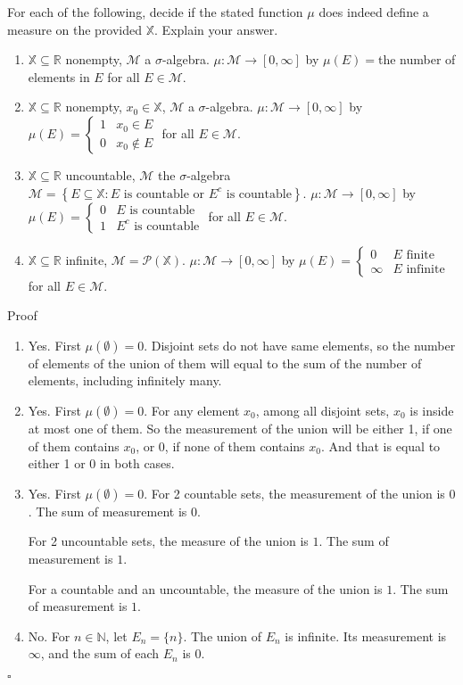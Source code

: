 \documentclass[12pt]{article}
\begin{document}
\item For each of the following, decide if the stated function $\mu$ does indeed define a measure on the provided $\mathbb{X}$.  Explain your answer.
\begin{enumerate}
\item $\mathbb{X}\subseteq\mathbb{R}$ nonempty, $\mathscr{M}$ a $\sigma$-algebra.  $\mu:\mathscr{M}\rightarrow[0,\infty]$ by $\mu(E)=$the number of elements in $E$ for all $E\in\mathscr{M}$.
\item $\mathbb{X}\subseteq\mathbb{R}$ nonempty, $x_0\in\mathbb{X}$, $\mathscr{M}$ a $\sigma$-algebra.  $\mu:\mathscr{M}\rightarrow[0,\infty]$ by $\mu(E)=\begin{cases}1&x_0\in E\\0&x_0\nin E\end{cases}$ for all $E\in\mathscr{M}$.
\item $\mathbb{X}\subseteq\mathbb{R}$ uncountable, $\mathscr{M}$ the $\sigma$-algebra $\mathscr{M}=\left\{E\subseteq \mathbb{X}:E\text{ is countable or }E^c\text{ is countable}\right\}$.  $\mu:\mathscr{M}\rightarrow[0,\infty]$ by $\mu(E)=\begin{cases}0&E\text{ is countable}\\1&E^c\text{ is countable}\end{cases}$ for all $E\in\mathscr{M}$.
\item $\mathbb{X}\subseteq\mathbb{R}$ infinite, $\mathscr{M}=\mathscr{P}(\mathbb{X})$.  $\mu:\mathscr{M}\rightarrow[0,\infty]$ by $\mu(E)=\begin{cases}0&E\text{ finite}\\\infty&E\text{ infinite}\end{cases}$ for all $E\in\mathscr{M}$.
\end{enumerate}

Proof

\begin{enumerate}
\item Yes. First $\mu(\emptyset) = 0$. Disjoint sets do not have same elements, so the number of elements of the union of them will equal to the sum of the number of elements, including infinitely many.
\item Yes. First $\mu(\emptyset) = 0$. For any element $x_0$, among all disjoint sets, $x_0$ is inside at most one of them. So the measurement of the union will be either 1, if one of them contains $x_0$, or 0, if none of them contains $x_0$. And that is equal to either 1 or 0 in both cases.
\item Yes. First $\mu(\emptyset) = 0$.
      For 2 countable sets, the measurement of the union is $0$. The sum of measurement is $0$.

      For 2 uncountable sets, the measure of the union is $1$. The sum of measurement is $1$.

      For a countable and an uncountable, the measure of the union is $1$. The sum of measurement is $1$.
\item No. For $n \in \mathbb{N}$, let $E_n = \{n\}$. The union of $E_n$ is infinite. Its measurement is $\infty$, and the sum of each $E_n$ is $0$.
\end{enumerate}
$\square$
\end{document}
